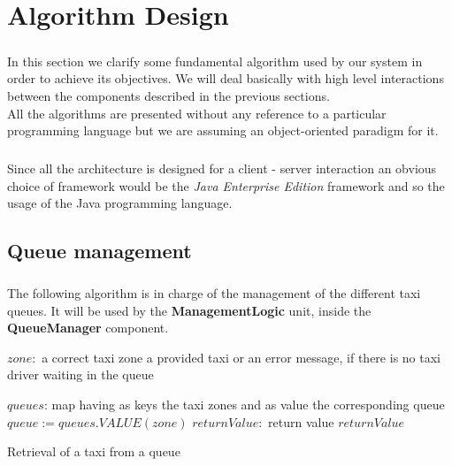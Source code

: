 \chapter{Algorithm Design}\label{chapter:algorithmDesign}
\paragraph{}In this section we clarify some fundamental algorithm used by our system in order to achieve its objectives. We will deal basically with high level interactions between the components described in the previous sections.\\
All the algorithms are presented without any reference to a particular programming language but we are assuming an object-oriented paradigm for it.
\paragraph{}Since all the architecture is designed for a client - server interaction an obvious choice of framework would be the \textit{Java Enterprise Edition} framework and so the usage of the Java programming language.

\section{Queue management}\label{alg:queueManagement}
\paragraph{}The following algorithm is in charge of the management of the different taxi queues. It will be used by the \textbf{ManagementLogic} unit, inside the \textbf{QueueManager} component.
\begin{algorithm}\label{alg:retrievingOfATaxi}
\begin{algorithmic}
\REQUIRE $zone:$ a correct taxi zone
\ENSURE a provided taxi or an error message, if there is no taxi driver waiting in the queue \linebreak

\STATE $queues$: map having as keys the taxi zones and as value the corresponding queue \linebreak
$queue:= queues.VALUE(zone)$  
$returnValue:$ return value
\ENDIF
\RETURN $returnValue$
\end{algorithmic}
\caption{Retrieval of a taxi from a queue}
\end{algorithm}
